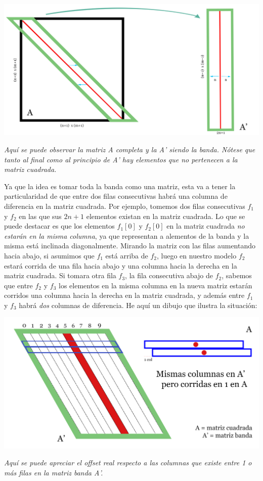 	\begin{center}
		\includegraphics[scale=1]{./img/matriz_A_idea.png}
		\vspace{2pt}
		\par
		\footnotesize\textit{Aquí se puede observar la matriz A completa y la A' siendo la banda. Nótese que tanto al final como al principio de A' hay elementos que no pertenecen a la matriz cuadrada.}
	\end{center}
	
	
Ya que la idea es tomar toda la banda como una matriz, esta va a tener la particularidad de que entre dos filas consecutivas habrá una columna de diferencia en la matriz cuadrada. Por ejemplo, tomemos dos filas consecutivas $f_1$ y $f_2$ en las que sus $2n+1$ elementos existan en la matriz cuadrada. Lo que se puede destacar es que los elementos $f_1[0]$ y $f_2[0]$ en la matriz cuadrada \textit{no estarán en la misma columna}, ya que representan a alementos de la banda y la misma está inclinada diagonalmente. Mirando la matriz con las filas aumentando hacia abajo, si asumimos que $f_1$ está arriba de $f_2$, luego en nuestro modelo $f_2$ estará corrida de una fila hacia abajo y una columna hacia la derecha en la matriz cuadrada. Si tomara otra fila $f_3$, la fila consecutiva abajo de $f_2$, sabemos que entre $f_2$ y $f_3$ los elementos en la misma columna en la nueva matriz estarán corridos una columna hacia la derecha en la matriz cuadrada, y además entre $f_1$ y $f_3$ habrá \textit{dos} columnas de diferencia. He aquí un dibujo que ilustra la situación:


	\begin{center}
		\includegraphics[scale=1]{./img/matriz_A_offset.png}
		\vspace{2pt}
		\par
		\footnotesize\textit{Aquí se puede apreciar el offset real respecto a las columnas que existe entre 1 o más filas en la matriz banda A'.}
	\end{center}
	
